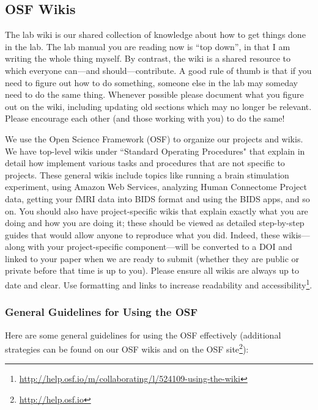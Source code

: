 \documentclass[letterpaper,12pt,oneside]{memoir}
\begin{document}
\subsection{OSF Wikis}

The lab wiki is our shared collection of knowledge about how to get things done in the lab. The lab manual you are reading now is ``top down'', in that I am writing the whole thing myself. By contrast, the wiki is a shared resource to which everyone can---and should---contribute. A good rule of thumb is that if you need to figure out how to do something, someone else in the lab may someday need to do the same thing. Whenever possible please document what you figure out on the wiki, including updating old sections which may no longer be relevant. Please encourage each other (and those working with you) to do the same!

We use the Open Science Framework (OSF) to organize our projects and wikis. We have top-level wikis under ``Standard Operating Procedures" that explain in detail how implement various tasks and procedures that are not specific to projects. These general wikis include topics like running a brain stimulation experiment, using Amazon Web Services, analyzing Human Connectome Project data, getting your fMRI data into BIDS format and using the BIDS apps, and so on. You should also have project-specific wikis that explain exactly what you are doing and how you are doing it; these should be viewed as detailed step-by-step guides that would allow anyone to reproduce what you did. Indeed, these wikis---along with your project-specific component---will be converted to a DOI and linked to your paper when we are ready to submit (whether they are public or private before that time is up to you). Please ensure all wikis are always up to date and clear. Use formatting and links to increase readability and accessibility\footnote{\url{http://help.osf.io/m/collaborating/l/524109-using-the-wiki}}.

\subsubsection{General Guidelines for Using the OSF}

Here are some general guidelines for using the OSF effectively (additional strategies can be found on our OSF wikis and on the OSF site\footnote{\url{http://help.osf.io}}):
\end{document}
